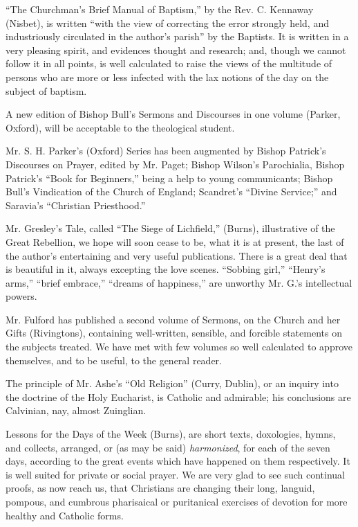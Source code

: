``The Churchman's Brief Manual of Baptism,'' by the
Rev. C. Kennaway (Nisbet), is written ``with the view of correcting the
error strongly held, and industriously circulated in the author's parish''
by the Baptists. It is written in a very pleasing spirit, and evidences
thought and research; and, though we cannot follow it in all points, is
well calculated to raise the views of the multitude of persons who are
more or less infected with the lax notions of the day on the subject of
baptism.

A new edition of Bishop Bull's Sermons and
Discourses in one volume (Parker, Oxford), will be acceptable to the
theological student.

Mr. S. H. Parker's (Oxford) Series has been
augmented by Bishop Patrick's Discourses on Prayer, edited by Mr. Paget;
Bishop Wilson's Parochialia, Bishop Patrick's ``Book for Beginners,''
being a help to young communicants; Bishop Bull's Vindication of the
Church of England; Scandret's ``Divine Service;'' and Saravia's ``Christian
Priesthood.''

Mr. Gresley's Tale, called ``The Siege of Lichfield,''
(Burns), illustrative of the Great Rebellion, we hope will soon cease to
be, what it is at present, the last of the author's entertaining and
very useful publications. There is a great deal that is beautiful in it,
always excepting the love scenes. ``Sobbing girl,'' ``Henry's arms,'' ``brief
embrace,'' ``dreams of happiness,'' are unworthy Mr. G.'s intellectual
powers.

Mr. Fulford has published a second volume of
Sermons, on the Church and her Gifts (Rivingtons), containing
well-written, sensible, and forcible statements on the subjects treated.
We have met with few volumes so well calculated to approve themselves,
and to be useful, to the general reader.

The principle of Mr. Ashe's ``Old Religion'' (Curry,
Dublin), or an inquiry into the doctrine of the Holy Eucharist, is
Catholic and admirable; his conclusions are Calvinian, nay, almost
Zuinglian.

Lessons for the Days of the Week (Burns), are short
texts, doxologies, hymns, and collects, arranged, or (as may be said) \emph{harmonized},
for each of the seven days, according to the great events which have
happened on them respectively. It is well suited for private or social
prayer. We are very glad to see such continual proofs, as now reach us,
that Christians are changing their long, languid, pompous, and cumbrous
pharisaical or puritanical exercises of devotion for more healthy and
Catholic forms.


